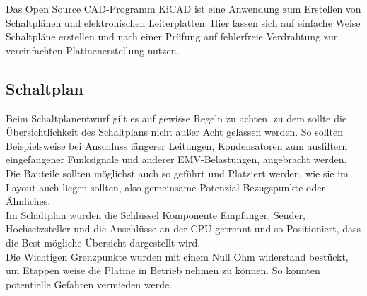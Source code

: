 
Das Open Source CAD-Programm KiCAD ist eine Anwendung zum Erstellen von Schaltplänen und elektronischen Leiterplatten. Hier lassen sich auf einfache Weise Schaltpläne erstellen und nach einer Prüfung auf fehlerfreie Verdrahtung zur vereinfachten Platinenerstellung nutzen. 

\subsection{Schaltplan}
Beim Schaltplanentwurf gilt es auf gewisse Regeln zu achten, zu dem sollte die Übersichtlichkeit des Schaltplans nicht außer Acht gelassen werden.
So sollten Beispielsweise bei Anschluss längerer Leitungen, Kondensatoren zum ausfiltern eingefangener Funksignale und anderer EMV-Belastungen, angebracht werden. Die Bauteile sollten möglichst auch so geführt und Platziert werden, wie sie im Layout auch liegen sollten, also gemeinsame Potenzial Bezugspunkte oder Ähnliches.\\
Im Schaltplan wurden die Schlüssel Komponente Empfänger, Sender, Hochsetzsteller und die Anschlüsse an der CPU getrennt und so Positioniert, dass die Best mögliche Übersicht dargestellt wird.\\
Die Wichtigen Grenzpunkte wurden mit einem Null Ohm widerstand bestückt, um Etappen weise die Platine in Betrieb nehmen zu können. So konnten potentielle Gefahren vermieden werde.\\

